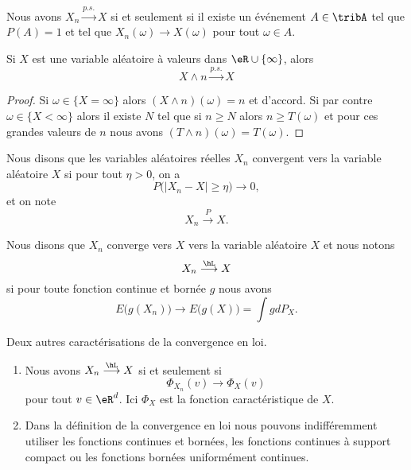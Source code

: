 \begin{lemma}
    Nous avons \( X_n\stackrel{p.s.}{\longrightarrow}X\) si et seulement si il existe un événement \( A\in\tribA\) tel que \( P(A)=1\) et tel que \( X_n(\omega)\to X(\omega)\) pour tout \( \omega\in A\).
\end{lemma}

\begin{lemma}
    Si \( X\) est une variable aléatoire à valeurs dans \( \eR\cup\{ \infty \}\), alors
    \begin{equation}
        X\wedge n\stackrel{p.s.}{\longrightarrow}X
    \end{equation}
\end{lemma}

\begin{proof}
    Si \( \omega\in\{ X=\infty \}\) alors \( (X\wedge n)(\omega)=n\) et d'accord. Si par contre \( \omega\in\{ X<\infty \}\) alors il existe \( N\) tel que si \( n\geq N\) alors \( n\geq T(\omega)\) et pour ces grandes valeurs de \( n\) nous avons \( (T\wedge n)(\omega)=T(\omega)\).
\end{proof}


Nous disons que les variables aléatoires réelles \( X_n\) convergent  vers la variable aléatoire \( X\) si pour tout \( \eta>0\), on a
\begin{equation}
    P\big( | X_n-X |\geq \eta \big)\to 0,
\end{equation}
et on note
\begin{equation}
    X_n\stackrel{P}{\longrightarrow}X.
\end{equation}

Nous disons que \( X_n\) converge vers \( X\)  vers la variable aléatoire \( X\) et nous notons
\begin{equation}
    X_n\stackrel{\hL}{\longrightarrow}X
\end{equation}
si pour toute fonction continue et bornée \( g\) nous avons
\begin{equation}
    E\big( g(X_n) \big)\to E\big( g(X) \big)=\int gdP_X.
\end{equation}

\begin{proposition}     \label{PrpopCaractCvL}
    Deux autres caractérisations de la convergence en loi.
    \begin{enumerate}
        \item
            Nous avons \( X_n\stackrel{\hL}{\longrightarrow}X\) si et seulement si
            \begin{equation}
                \Phi_{X_n}(v)\to\Phi_X(v)
            \end{equation}
            pour tout \( v\in\eR^d\). Ici \( \Phi_X\) est la fonction caractéristique de \( X\).
        \item
            Dans la définition de la convergence en loi nous pouvons indifféremment utiliser les fonctions continues et bornées, les fonctions continues à support compact ou les fonctions bornées uniformément continues.
    \end{enumerate}
\end{proposition}

